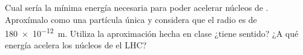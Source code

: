 \documentclass[./../main.tex]{subfiles}
\begin{document}
	\begin{exercise}
		Cual sería la mínima energía necesaria para poder acelerar núcleos de . Aproxímalo como una partícula única y considera que el radio es de \SI{180e-12}{\m}. Utiliza la aproximación hecha en clase ¿tiene sentido? ¿A qué energía acelera los núcleos de  el LHC?
	\end{exercise}
\end{document}
